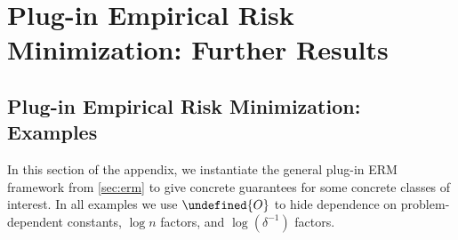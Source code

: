 \documentclass[11pt]{article} %
\newcommand{\pref}[1]{\cref{#1}}
\theoremstyle{theorem}  %
\theoremstyle{plain}
\newcommand{\wt}[1]{\widetilde{#1}}
\let\wt\undefined
\newcommand{\wt}[1]{\widetilde{#1}}
\begin{document}
%
%
%
%
%
%
%
%

\section{Plug-in Empirical Risk Minimization: Further Results}
\label{app:plugin}

\subsection{Plug-in Empirical Risk Minimization: Examples}
\label{sec:specific_classes}
%
In this section of the appendix, we instantiate the general plug-in
ERM framework from \pref{sec:erm} to give concrete guarantees for some
concrete classes of interest. In all examples we use $\wt{O}$ to hide dependence on problem-dependent constants, $\log{}n$ factors, and $\log(\delta^{-1})$ factors.
\end{document}
